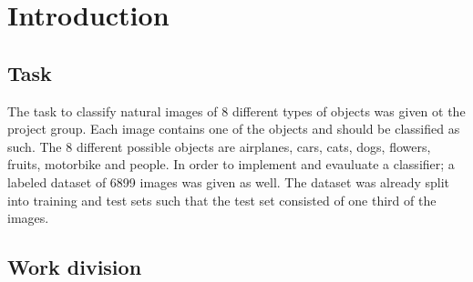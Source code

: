 \documentclass[doc/report.tex]{subfiles}
\begin{document}
\section{Introduction}

\subsection{Task}
The task to classify natural images of 8 different types of objects was given
ot the project group. Each image contains one of the objects and should be
classified as such. The 8 different possible objects are airplanes, cars, cats,
dogs, flowers, fruits, motorbike and people. In order to implement and
evauluate a classifier; a labeled dataset of 6899 images was given as well. The
dataset was already split into training and test sets such that the test set
consisted of one third of the images.

\subsection{Work division}
    
\end{document}
